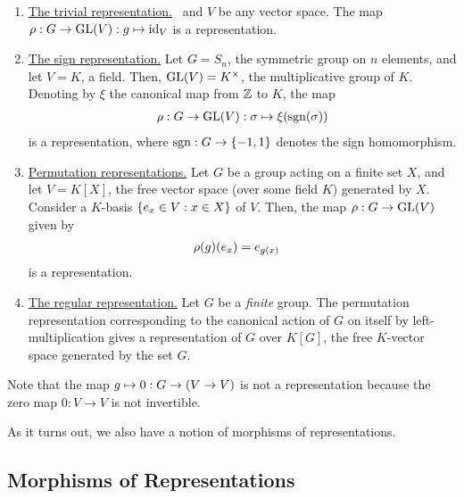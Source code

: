 \begin{boxexample}
    \hfill
    \begin{enumerate}
        \item \underline{The trivial representation.} \ and $V$ be any vector space. The map $\rho : G \to \operatorname{GL}\!\left( V \right) : g \mapsto \operatorname{id}_{V}$ is a representation.
        
        \item \underline{The sign representation.} Let $G = S_n$, the symmetric group on $n$ elements, and let $V = K$, a field. Then, $\operatorname{GL}\!\left( V \right) = K^{\times}$, the multiplicative group of $K$. Denoting by $\xi$ the canonical map from $\mathbb{Z}$ to $K$, the map
        \begin{align*}
            \rho : G \to \operatorname{GL}\!\left( V \right) : \sigma \mapsto \xi\!\left( \operatorname{sgn}\!\left( \sigma \right) \right)
        \end{align*}
        is a representation, where $\operatorname{sgn} : G \to \left\{ -1,1 \right\}$ denotes the sign homomorphism.

        \item \underline{Permutation representations.} Let $G$ be a group acting on a finite set $X$, and let $V = K[X]$, the free vector space (over some field $K$) generated by $X$. Consider a $K$-basis $\left\{ e_x \in V : x \in X \right\}$ of $V$. Then, the map $\rho : G \to \operatorname{GL}\!\left( V \right)$ given by
        \begin{align*}
            \rho\!\left( g \right)\!\left( e_x \right) &= e_{g(x)}
        \end{align*}
        is a representation.

        \item \underline{The regular representation.} Let $G$ be a \textit{finite} group. The permutation representation corresponding to the canonical action of $G$ on itself by left-multiplication gives a representation of $G$ over $K[G]$, the free $K$-vector space generated by the set $G$.
    \end{enumerate}
    Note that the map $g \mapsto 0 : G \to \left( V \to V \right)$ is not a representation because the zero map $0 : V \to V$ is not invertible.
\end{boxexample}

As it turns out, we also have a notion of morphisms of representations.

\subsection{Morphisms of Representations}

